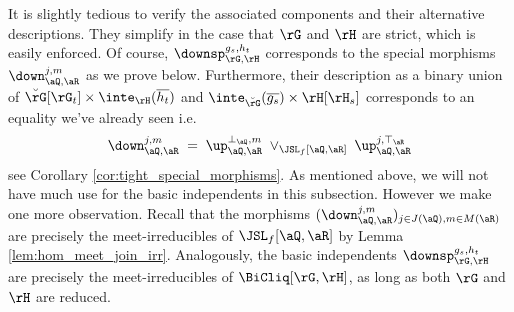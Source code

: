 \documentclass{article}
\begin{document}
\begin{example}
\begin{enumerate}
\[\begin{tabular}{ll}
\begin{tabular}{ll}
\end{tabular}
\end{tabular}
\]
It is slightly tedious to verify the associated components and their alternative descriptions. They simplify in the case that $\rG$ and $\rH$ are strict, which is easily enforced. Of course, $\downsp_{\rG,\rH}^{g_s,h_t}$ corresponds to the special morphisms $\down_{\aQ,\aR}^{j,m}$ as we prove below. Furthermore, their description as a binary union of  $\breve{\rG}[\rG_t] \times \inte_{\rH}(\overline{h_t})$ and $\inte_{\breve{\rG}}(\overline{g_s}) \times \rH[\rH_s]$ corresponds to an equality we've already seen i.e.\
\[
\down_{\aQ,\aR}^{j,m}
\; = \; \up_{\aQ,\aR}^{\bot_\aQ,m} \; \lor_{\JSL_f[\aQ,\aR]} \; \up_{\aQ,\aR}^{j,\top_\aR}
\]
see Corollary \ref{cor:tight_special_morphisms}. As mentioned above, we will not have much use for the basic independents in this subsection. However we make one more observation. Recall that the morphisms $(\down_{\aQ,\aR}^{j,m})_{j \in J(\aQ),m \in M(\aR)}$ are precisely the meet-irreducibles of $\JSL_f[\aQ,\aR]$ by Lemma \ref{lem:hom_meet_join_irr}. Analogously, the basic independents $\downsp_{\rG,\rH}^{g_s,h_t}$ are precisely the meet-irreducibles of $\BiCliq[\rG,\rH]$, as long as both $\rG$ and $\rH$ are reduced. \endbox
\end{enumerate}
\end{example}


\smallskip
\end{document}
